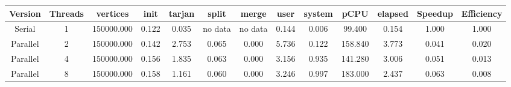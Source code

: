 \begin{tabular}{|c|c|c|c|c|c|c|c|c|c|c|c|c|}
\toprule
 Version &  Threads &   vertices &  init &  tarjan &   split &   merge &  user &  system &    pCPU &  elapsed &  Speedup &  Efficiency \\
\midrule
  Serial &        1 & 150000.000 & 0.122 &   0.035 & no data & no data & 0.144 &   0.006 &  99.400 &    0.154 &    1.000 &       1.000 \\
Parallel &        2 & 150000.000 & 0.142 &   2.753 &   0.065 &   0.000 & 5.736 &   0.122 & 158.840 &    3.773 &    0.041 &       0.020 \\
Parallel &        4 & 150000.000 & 0.156 &   1.835 &   0.063 &   0.000 & 3.156 &   0.935 & 141.280 &    3.006 &    0.051 &       0.013 \\
Parallel &        8 & 150000.000 & 0.158 &   1.161 &   0.060 &   0.000 & 3.246 &   0.997 & 183.000 &    2.437 &    0.063 &       0.008 \\
\bottomrule
\end{tabular}
